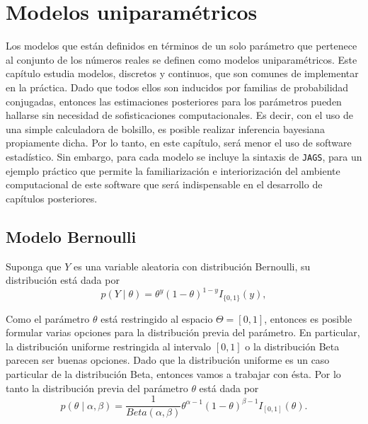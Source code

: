 
  
  \chapter{Modelos uniparam\'etricos}

    
  Los modelos que est\'an definidos en t\'erminos de un solo par\'ametro que pertenece al conjunto de los n\'umeros reales se definen como modelos uniparam\'etricos. Este cap\'itulo estudia modelos, discretos y continuos, que son comunes de implementar en la pr\'actica. Dado que todos ellos son inducidos por familias de probabilidad conjugadas, entonces las estimaciones posteriores para los par\'ametros pueden hallarse sin necesidad de sofisticaciones computacionales. Es decir, con el uso de una simple calculadora de bolsillo, es posible realizar inferencia bayesiana propiamente dicha. Por lo tanto, en este cap\'itulo, ser\'a menor el uso de software estad\'istico. Sin embargo, para cada modelo se incluye la sintaxis de \texttt{JAGS}, para un ejemplo pr\'actico que permite la familiarizaci\'on e interiorizaci\'on del ambiente computacional de este software que ser\'a indispensable en el desarrollo de cap\'itulos posteriores.
    
\section{Modelo Bernoulli}
    
Suponga que $Y$ es una variable aleatoria con distribuci\'on Bernoulli, su distribuci\'on est\'a dada por
    \begin{equation}
    p(Y \mid \theta)=\theta^y(1-\theta)^{1-y}I_{\{0,1\}}(y),
    \end{equation}
    
    Como el par\'ametro $\theta$ est\'a restringido al espacio $\Theta=[0,1]$, entonces es posible formular varias opciones para la distribuci\'on previa del par\'ametro. En particular, la distribuci\'on uniforme restringida al intervalo $[0,1]$ o la distribuci\'on Beta parecen ser buenas opciones. Dado que la distribuci\'on uniforme es un caso particular de la distribuci\'on Beta, entonces vamos a trabajar con \'esta. Por lo tanto la distribuci\'on previa del par\'ametro $\theta$ est\'a dada por
    \begin{equation}\label{beta_distribution}
    p(\theta \mid \alpha,\beta)=\frac{1}{Beta(\alpha,\beta)}\theta^{\alpha-1}(1-\theta)^{\beta-1}I_{[0,1]}(\theta).
    \end{equation}
    
